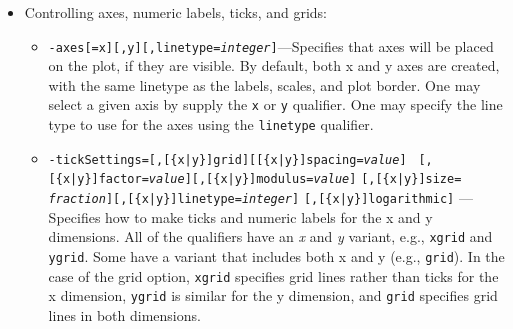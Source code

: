 \begin{itemize}
\begin{itemize}
\begin{itemize}
  \item {\tt -sameScale[=x][,y][,global]}---Specifies that separate panels of data shall be displayed
on the same scales.  In other words, any autoscaling is done based on all of the data from a request,
rather than simply the data on a particular plot panel.  If given without these qualifiers, both x
and y are affected.  {\tt global} forces {\tt sddsplot} to impose the desired condition across all
plot requests.

  \item {\tt -zoom=[\{x|y\}Factor={\em value}][,\{x|p\}Center={\em value}][,\{y|q\}Center={\em
value}]} --- Specifies zoom and pan starting from the scales set by autoscaling or by {\tt -scales}.
A factor less than (greater than) unity zooms out (in).  For each dimension, one may specify the
center of the plot using either the

  \item {\tt -aspectRatio={\em value}} --- Specifies the y/x aspect ratio of the plot.  The value
must be nonzero.  If it is positive, then the desired aspect ratio is obtained by altering the
pspace.  If it is negative, the desired aspect ratio (the absolute value of the value given) is
obtained by altering the data coordinate range.

  \item {\tt -pSpace={\em hMin}{,\em hMax}{,\em vMin}{,\em vMax}}---This option is seldom used, but allows
control of the region of the panel that is mapped to data coordinates, said region being the ``plot space''
or ``pspace''.  The first two coordinates give the horizontal extent, while the second two give the 
vertical extent.  The coordinate values are between 0 and 1.  The defaults are [0.15, 0.9]x[0.15, 0.9].
  \end{itemize}
\item Controlling axes, numeric labels, ticks, and grids:
  \begin{itemize}
  \item {\tt -axes[=x][,y][,linetype={\em integer}]}---Specifies that axes will be placed on the plot,
if they are visible.  By default, both x and y axes are created, with the same linetype as the labels,
scales, and plot border.  One may select a given axis by supply the {\tt x} or {\tt y} qualifier.
One may specify the line type to use for the axes using the {\tt linetype} qualifier.

  \item {\tt -tickSettings=[,[\{x|y\}]grid][[\{x|y\}]spacing={\em value}]} {\tt
[,[\{x|y\}]factor={\em value}][,[\{x|y\}]modulus={\em value}]} {\tt [,[\{x|y\}]size={\em
fraction}][,[\{x|y\}]linetype={\em integer}]} {\tt [,[\{x|y\}]logarithmic]} --- Specifies how to make
ticks and numeric labels for the x and y dimensions. All of the qualifiers have an {\em x} and {\em
y} variant, e.g., {\tt xgrid} and {\tt ygrid}.  Some have a variant that includes both x and y (e.g.,
{\tt grid}).  In the case of the grid option, {\tt xgrid} specifies grid lines rather than ticks for
the x dimension, {\tt ygrid} is similar for the y dimension, and {\tt grid} specifies grid lines in
both dimensions.


\end{itemize}
\end{itemize}
\end{itemize}
